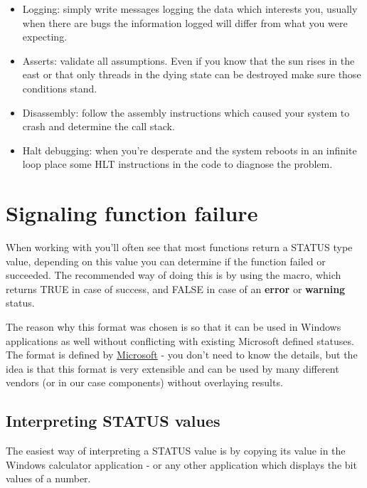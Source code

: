 \begin{appendices}
\begin{itemize}
	\item Logging: simply write messages logging the data which interests you, usually when there
are bugs the information logged will differ from what you were expecting.

	\item Asserts: validate all assumptions. Even if you know that the sun rises in the east or that
only threads in the dying state can be destroyed make sure those conditions stand.

	\item Disassembly: follow the assembly instructions which caused your system to crash and 
determine the call stack.

	\item Halt debugging: when you're desperate and the system reboots in an infinite loop place
some HLT instructions in the code to diagnose the problem.
\end{itemize}

\section{Signaling function failure}

When working with \projectname you'll often see that most functions return a STATUS type
value, depending on this value you can determine if the function failed or succeeded.
The recommended way of doing this is by using the  macro, which returns TRUE in
case of success, and FALSE in case of an \textbf{\color{red} error} or \textbf{\color{orange} warning} status.

The reason why this format was chosen is so that it can be used in Windows applications as well
without conflicting with existing Microsoft defined statuses. The format is defined by \href{https://docs.microsoft.com/en-us/windows-hardware/drivers/kernel/defining-new-ntstatus-values}{Microsoft} - you don't need to know the details, but the idea is that this format is very extensible and can be used by many different vendors (or in our case components) without overlaying results.

\subsection{Interpreting STATUS values}

The easiest way of interpreting a STATUS value is by copying its value in the Windows
calculator application - or any other application which displays the bit values of a number.


\end{appendices}
